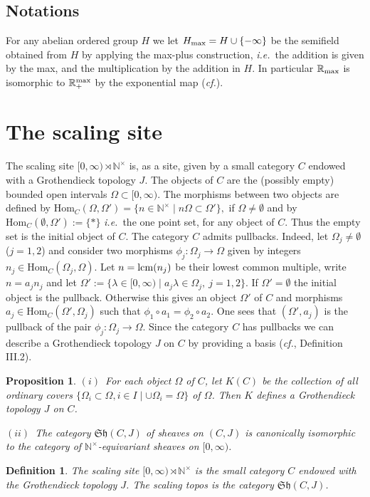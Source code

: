\documentclass{elsart3-1}
\newtheorem{e-proposition}[theorem]{Proposition}
\newtheorem{e-definition}[theorem]{Definition\rm}
\def\Hom{{\rm Hom}}
\def\N{{\mathbb N}}
\def\R{{\mathbb R}}
\newcommand{\ie}{{\it i.e.\/}\ }
\newcommand{\cf}{{\it cf.}}
\def\Hom {{\mbox{Hom}}}
\def\rmax{\R_+^{\rm max}}
\def\sh{\mathfrak{Sh}}
\def\nt{\N^{\times}}
\def\rnt{{[0,\infty)\rtimes{\N^{\times}}}}
\def\vsp{\vspace{.05in}}
\begin{document}
\subsection{Notations} For any abelian ordered group $H$ we let $H_{\rm max}=H\cup \{-\infty\}$ be the semifield obtained from $H$ by applying the max-plus construction, \ie the addition is given by the max, and the multiplication by the addition in $H$. In particular $\R_{\rm max}$ is isomorphic to $\rmax$ by the exponential map (\cf \cite{Gaubert}). 
\vspace*{-.5cm}

\section{The scaling site}
\vspace*{-.3cm}

  The scaling site $\rnt$ is, as a  site, given by a small category $C$ endowed with a Grothendieck topology $J$. The objects of $C$ are the (possibly empty) bounded open intervals 
$\Omega\subset [0,\infty)$. The morphisms between two objects are defined by 
$
\Hom_C(\Omega,\Omega')=\{n\in \nt\mid n\Omega\subset \Omega'\},
$
 if $\Omega\neq \emptyset$ and by $\Hom_C(\emptyset,\Omega'):=\{*\}$ \ie the one point set, for any object of $C$. Thus the empty set is the initial object of $C$.
The category $C$ admits pullbacks. Indeed, let $\Omega_j\neq \emptyset$ ($j=1,2$) and consider two morphisms $\phi_j:\Omega_j\to \Omega$ given by integers $n_j\in \Hom_C(\Omega_j,\Omega)$. Let $n={\rm lcm}(n_j)$ be their lowest common multiple, write $n=a_jn_j$ and let $\Omega':=\{\lambda \in [0,\infty)\mid a_j\lambda \in \Omega_j, \ j=1,2\}$. If $\Omega'=\emptyset$ the initial object is the pullback. Otherwise this gives an object $\Omega'$ of $C$ and morphisms $a_j\in \Hom_C(\Omega',\Omega_j)$ such that $\phi_1\circ a_1=\phi_2\circ a_2$. One sees that $(\Omega',a_j)$ is the pullback of the pair $\phi_j:\Omega_j\to \Omega$. Since the category $C$ has pullbacks we can describe a Grothendieck topology $J$ on $C$ by providing a basis (\cf \cite{MM}, Definition III.2). 
\vsp

\begin{e-proposition}%
$(i)$~For each object $\Omega$ of $C$, let $K(C)$ be the collection of all ordinary covers $\{\Omega_i\subset \Omega, i\in I\mid \cup \Omega_i=\Omega\}$ of $\Omega$. Then $K$ defines a Grothendieck topology $J$ on $C$.

$(ii)$~The category $\sh(C,J)$ of sheaves on $(C,J)$ is canonically isomorphic to the category of $\nt$-equivariant sheaves on $[0,\infty)$.
\end{e-proposition} 
\vsp
\begin{e-definition}%
The {\em scaling site} $\rnt$ is the small category $C$ endowed with the Grothendieck topology $J$. The scaling topos is the category $\sh(C,J)$.
\end{e-definition}
\vsp
\vspace*{-.5cm}
\end{document}
